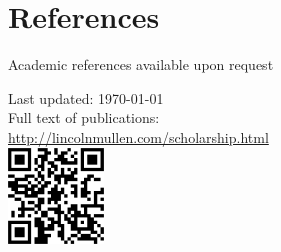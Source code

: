 \documentclass[11pt]{article}
\begin{document}
\section*{References}
\noindent
Academic references available upon request

\vfill{}

\begin{center}
{\scriptsize 
Last updated: \today\\[.25cm]
Full text of publications:\\
\href{http://lincolnmullen.com/scholarship.html}{http://lincolnmullen.com/scholarship.html}\\[.1cm]
}
\includegraphics[keepaspectratio=true,width=1in]{qrcode.png}
\end{center}
\end{document}
